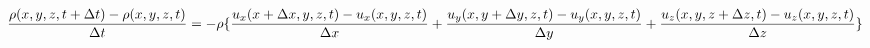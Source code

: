 $$ \frac{\rho(x,y,z,t+\Delta t) - \rho(x,y,z,t)}{\Delta t} \\ = - \rho \{ \frac{u_x(x+\Delta x,y,z,t) - u_x(x,y,z,t)}{\Delta x}\\ + \frac{u_y(x,y+\Delta y,z,t) - u_y(x,y,z,t)}{\Delta y}\\ + \frac{u_z(x,y,z+\Delta z,t) - u_z(x,y,z,t)}{\Delta z} \} $$
